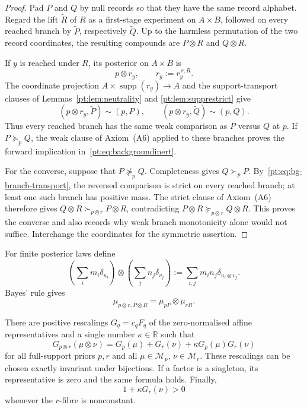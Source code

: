 \begin{proof}
Pad $P$ and $Q$ by null records so that they have the same record alphabet.
Regard the lift $\widetilde R$ of $R$ as a first-stage experiment on
$A\times B$, followed on every reached branch by $\widetilde P$, respectively
$\widetilde Q$.  Up to the harmless permutation of the two record
coordinates, the resulting compounds are $P\otimes R$ and $Q\otimes R$.

If $y$ is reached under $R$, its posterior on $A\times B$ is
\[
 p\otimes r_y,
 \qquad r_y:=r_y^{\,r,R}.
\]
The coordinate projection $A\times\operatorname{supp}(r_y)\to A$ and the
support-transport clauses of Lemmas~\ref{pt:lem:neutrality} and
\ref{pt:lem:supprestrict} give
\[
 (p\otimes r_y,\widetilde P)\sim(p,P),
 \qquad
 (p\otimes r_y,\widetilde Q)\sim(p,Q).
\tag{BI$'$}\label{pt:eq:bg-branch-transport}
\]
Thus every reached branch has the same weak comparison as $P$ versus $Q$ at
$p$.  If $P\succeq_pQ$, the weak clause of Axiom~\textup{(A6)} applied to
these branches proves the forward implication in~\eqref{pt:eq:backgroundinert}.

For the converse, suppose that $P\not\succeq_pQ$.  Completeness gives
$Q\succ_pP$.  By~\eqref{pt:eq:bg-branch-transport}, the reversed comparison is
strict on every reached branch; at least one such branch has positive mass.
The strict clause of Axiom~\textup{(A6)} therefore gives
$Q\otimes R\succ_{p\otimes r}P\otimes R$, contradicting
$P\otimes R\succeq_{p\otimes r}Q\otimes R$.  This proves the converse and
also records why weak branch monotonicity alone would not suffice.  Interchange
the coordinates for the symmetric assertion.
\end{proof}

For finite posterior laws define
\[
 \left(\sum_i m_i\delta_{u_i}\right)\otimes
 \left(\sum_j n_j\delta_{v_j}\right)
 :=\sum_{i,j}m_i n_j\delta_{u_i\otimes v_j}.
\]
Bayes' rule gives
\begin{equation}
 \mu_{p\otimes r,P\otimes R}=\mu_{pP}\otimes\mu_{rR}.
\tag{PL}\label{pt:eq:productlaw}
\end{equation}

\begin{lemma}
\label{pt:lem:coherentnorm}
There are positive rescalings $G_q=c_qF_q$ of the zero-normalised affine
representatives and a single number $\kappa\in\mathbb R$ such that
\begin{equation}
 G_{p\otimes r}(\mu\otimes\nu)
 =G_p(\mu)+G_r(\nu)+\kappa G_p(\mu)G_r(\nu)
\tag{QA}\label{pt:eq:QA}
\end{equation}
for all full-support priors $p,r$ and all
$\mu\in\mathcal M_p$, $\nu\in\mathcal M_r$.  These rescalings can be chosen
exactly invariant under bijections.  If a factor is a singleton, its
representative is zero and the same formula holds.  Finally,
\begin{equation}
 1+\kappa G_r(\nu)>0
\tag{POS}\label{pt:eq:QAslope}
\end{equation}
whenever the $r$-fibre is nonconstant.
\end{lemma}

